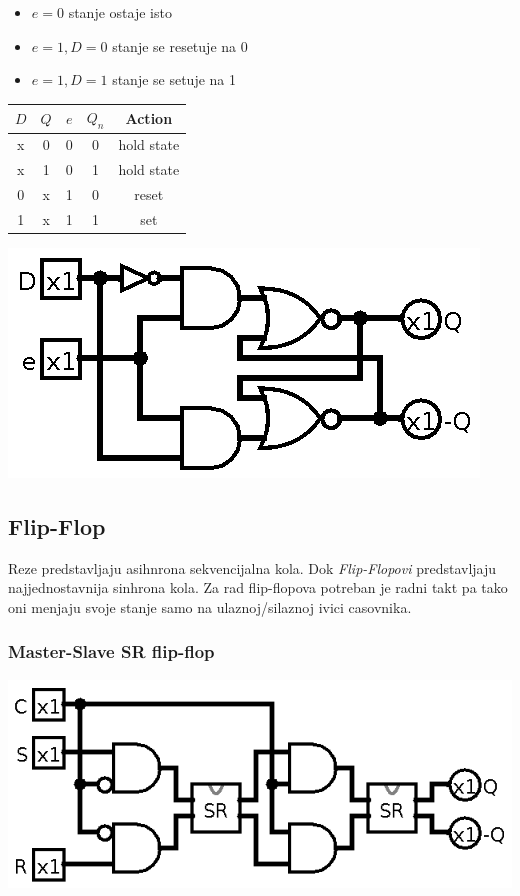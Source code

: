 \documentclass[12p,a4paper]{article}
\begin{document}
\begin{multicols}{2}
    \begin{itemize}
        \itemsep0em
        \item $e = 0$ stanje ostaje isto
        \item $e = 1, D = 0$ stanje se resetuje na 0
        \item $e = 1, D = 1$ stanje se setuje na 1
    \end{itemize}

    \begin{tabular}{*{5}{c}}
        $D$ & $Q$ & $e$ & $Q_n$ & Action \\
        \midrule
         x  &  0  &  0  &  0  & hold state\\
         x  &  1  &  0  &  1  & hold state\\
         0  &  x  &  1  &  0  & reset \\
         1  &  x  &  1  &  1  & set \\
    \end{tabular}

    \includegraphics[width=0.7\columnwidth]{Figures/d_latch.png}

    \subsection{Flip-Flop}

    Reze predstavljaju asihnrona sekvencijalna kola. Dok \emph{Flip-Flopovi} 
    predstavljaju najjednostavnija sinhrona kola. Za rad flip-flopova potreban
    je radni takt pa tako oni menjaju svoje stanje samo na ulaznoj/silaznoj
    ivici casovnika.

    \subsubsection{Master-Slave SR flip-flop}

    \includegraphics[width=0.8\columnwidth]{Figures/sr_ms_flipflop.png}


\end{multicols}
\end{document}
